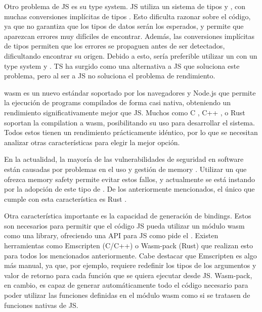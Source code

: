 Otro problema de \gls{JS} es su \gls{type system}. \gls{JS} utiliza un sistema
de tipos  y , con muchas conversiones implícitas de tipos
\parencite{js-type-system}. Esto dificulta razonar sobre el código, ya que no
garantiza que los tipos de datos serán los esperados, y permite que aparezcan
errores muy difíciles de encontrar. Además, las conversiones implícitas de tipos
permiten que los errores se propaguen antes de ser detectados, dificultando
encontrar su origen. Debido a esto, sería preferible utilizar un
 con un \gls{type system}
 y .
\gls{TS} \parencite{typescript} ha surgido como una alternativa a \gls{JS} que
soluciona este problema, pero al ser  a \gls{JS}
no soluciona el problema de rendimiento.

\gls{wasm} \parencite{wasm} es un nuevo estándar soportado por los navegadores y
Node.js que permite la ejecución de \glspl{program} compilados de forma casi
nativa, obteniendo un rendimiento significativamente mejor que \gls{JS}. Muchos
 como C \parencite{C}, C++
\parencite{cpp}, o Rust \parencite{Rust} soportan la \gls{compilation} a
\gls{wasm}, posibilitando su uso para desarrollar el sistema. Todos estos
 tienen un rendimiento prácticamente
idéntico, por lo que se necesitan analizar otras características para elegir la
mejor opción.

En la actualidad, la mayoría de las vulnerabilidades de seguridad en software
están causadas por problemas en el uso y gestión de \gls{memory}
\parencite{microsoft-memory-safety} \parencite{mozilla-memory-safety}. Utilizar
un  que ofrezca \gls{memory safety} permite evitar estos fallos, y
actualmente se está instando por la adopción de este tipo de 
\parencite{CISA-memory-safety} \parencite{whitehouse-memory-safety}. De los
anteriormente mencionados, el único que cumple con esta característica
es Rust \parencite{C-memory-safety}. %

Otra característica importante es la capacidad de generación de \glspl{binding}.
Estos son necesarios para permitir que el código \gls{JS} pueda utilizar un
módulo \gls{wasm} como una \gls{library}, ofreciendo una \gls{API} para \gls{JS}
como pide el . Existen herramientas como Emscripten (C/C++)
\parencite{Emscripten} o Wasm-pack (Rust) \parencite{Wasm-pack} que realizan
esto para todos los  mencionados
anteriormente. Cabe destacar que Emscripten es algo más manual, ya que, por
ejemplo, requiere redefinir los tipos de los argumentos y valor de retorno para
cada función que se quiera ejecutar desde \gls{JS}. Wasm-pack, en cambio, es
capaz de generar automáticamente todo el código necesario para poder utilizar
las funciones definidas en el módulo \gls{wasm} como si se tratasen de funciones
nativas de \gls{JS}.

